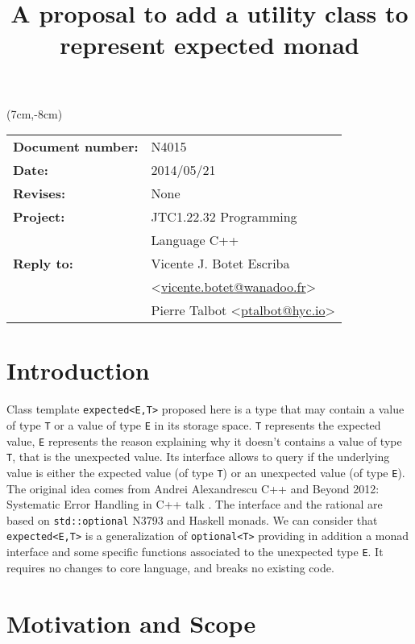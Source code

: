 \documentclass[a4paper,10pt]{article}
\title{A proposal to add a utility class to represent expected monad}
\author{}
\date{}
\newcommand{\cpp}[1]{\lstinline{#1}}
\begin{document}
\maketitle
\begin{textblock*}{9cm}(7cm,-8cm)
\begin{tabular}{l l}
\textbf{Document number:} & N4015 \\
\textbf{Date:}  & 2014/05/21 \\
\textbf{Revises:} & None \\
\textbf{Project:} & JTC1.22.32 Programming \\
 & Language C++ \\
\textbf{Reply to:} & Vicente J. Botet Escriba \\
 & <\href{mailto:vicente.botet@wanadoo.fr}{vicente.botet@wanadoo.fr}> \\
 & Pierre Talbot <\href{mailto:ptalbot@hyc.io}{ptalbot@hyc.io}>
\end{tabular}
\end{textblock*}

\vspace{-6em}
\setcounter{tocdepth}{1}
\tableofcontents

\section{Introduction}

Class template \cpp{expected<E,T>} proposed here is a type that may contain a value of type \cpp{T} or a value of type \cpp{E} in its storage space. \cpp{T} represents the expected value, \cpp{E} represents the reason explaining why it doesn't contains a value of type \cpp{T}, that is the unexpected value. Its interface allows to query if the underlying value is either the expected value (of type \cpp{T}) or an unexpected value (of type \cpp{E}). The original idea comes from Andrei Alexandrescu C++ and Beyond 2012: Systematic Error Handling in C++ talk \cite{AlexandrescuExpected}. The interface and the rational are based on \cpp{std::optional} N3793 \cite{OptionalRev5} and Haskell monads. We can consider that \cpp{expected<E,T>} is a generalization of \cpp{optional<T>} providing in addition a monad interface and some specific functions associated to the unexpected type \cpp{E}. It requires no changes to core language, and breaks no existing code.

\section{Motivation and Scope}
\label{motiv-scope}
\end{document}
